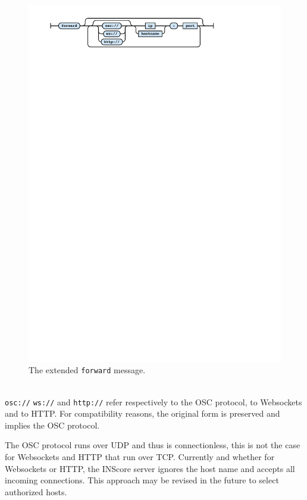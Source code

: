 \documentclass{article}
\newcommand{\icode}[1]	{{\small \texttt{#1}}}
\begin{document}
\begin{figure}[h]
\centering
\includegraphics[width=0.98\columnwidth]{rsrc/faust4.pdf}
\caption{The extended \icode{forward} message.}
\label{fig:newforward}
\end{figure}\\
\icode{osc://} \icode{ws://} and \icode{http://} refer respectively to the OSC protocol, to Websockets and to HTTP.
For compatibility reasons, the original form is preserved and implies the OSC protocol.

The OSC protocol runs over UDP and thus is connectionless, this is not the case for Websockets and HTTP that run over TCP.
Currently and whether for Websockets or HTTP, the INScore server ignores the host name and accepts all incoming connections. This approach may be revised in the future to select authorized hosts.

\end{document}
